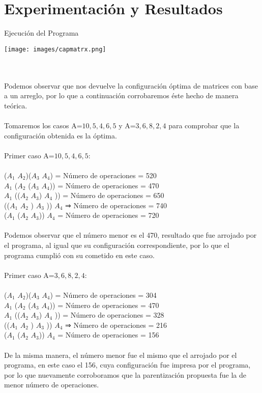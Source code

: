 \documentclass[12pt,twoside]{article}
\begin{document}
\section{Experimentaci\'on y Resultados}
Ejecuci\'on del Programa
\centerline{\texttt{[image: images/capmatrx.png]}}\\\\
Podemos observar que nos devuelve la configuraci\'on \'optima de matrices con base a un arreglo, por lo que a continuaci\'on corrobaremos \'este hecho de manera te\'orica.\\\\
Tomaremos los casos A=${10,5,4,6,5}$ y A=${3,6,8,2,4}$ para comprobar que la configuraci\'on obtenida es la \'optima.\\\\\newpage
Primer caso A=${10,5,4,6,5}$:\\\\
($A_{1}$ $A_{2}$)($A_{3}$ $A_{4}$) = N\'umero de operaciones = 520\\
$A_{1}$ ($A_{2}$ ($A_{3}$ $A_{4}$)) = N\'umero de operaciones = 470\\
$A_{1}$ (($A_{2}$ $A_{3}$) $A_{4}$ )) = N\'umero de operaciones = 650\\
(($A_{1}$ $A_{2}$ ) $A_{3}$ )) $A_{4}$ ⇒ N\'umero de operaciones = 740\\
($A_{1}$ ($A_{2}$ $A_{3}$)) $A_{4}$ = N\'umero de operaciones = 720\\\\
Podemos observar que el n\'umero menor es el 470, resultado que fue arrojado por el programa, al igual que su configuraci\'on correspondiente, por lo que el programa cumpli\'o con su cometido en este caso.\\\\
Primer caso A=${3,6,8,2,4}$:\\\\
($A_{1}$ $A_{2}$)($A_{3}$ $A_{4}$) = N\'umero de operaciones = 304\\
$A_{1}$ ($A_{2}$ ($A_{3}$ $A_{4}$)) = N\'umero de operaciones = 470\\
$A_{1}$ (($A_{2}$ $A_{3}$) $A_{4}$ )) = N\'umero de operaciones = 328\\
(($A_{1}$ $A_{2}$ ) $A_{3}$ )) $A_{4}$ ⇒ N\'umero de operaciones = 216\\
($A_{1}$ ($A_{2}$ $A_{3}$)) $A_{4}$ = N\'umero de operaciones = 156\\\\
De la misma manera, el n\'umero menor fue el mismo que el arrojado por el programa, en este caso el 156, cuya configuraci\'on fue impresa por el programa, por lo que nuevamente corroboramos que la parentizaci\'on propuesta fue la de menor n\'umero de operaciones.
\end{document}
